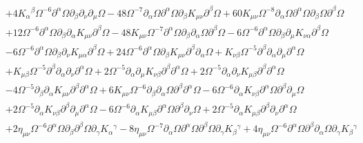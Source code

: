 \documentclass[aps]{revtex4}
\begin{document}
\begin{align}
\nonumber\\
&+ 4 K_{\alpha}{}^{\beta} \Omega^{-6} \partial^{\alpha}\Omega \partial_{\beta}\partial_{\nu}\partial_{\mu}\Omega - 48 \Omega^{-7} \partial_{\alpha}\Omega \partial^{\alpha}\Omega \partial_{\beta}K_{\mu \nu} \partial^{\beta}\Omega + 60 K_{\mu \nu} \Omega^{-8} \partial_{\alpha}\Omega \partial^{\alpha}\Omega \partial_{\beta}\Omega \partial^{\beta}\Omega
\nonumber\\
& + 12 \Omega^{-6} \partial^{\alpha}\Omega \partial_{\beta}\partial_{\alpha}K_{\mu \nu} \partial^{\beta}\Omega - 48 K_{\mu \nu} \Omega^{-7} \partial^{\alpha}\Omega \partial_{\beta}\partial_{\alpha}\Omega \partial^{\beta}\Omega - 6 \Omega^{-6} \partial^{\alpha}\Omega \partial_{\beta}\partial_{\mu}K_{\nu \alpha} \partial^{\beta}\Omega
\nonumber\\
& - 6 \Omega^{-6} \partial^{\alpha}\Omega \partial_{\beta}\partial_{\nu}K_{\mu \alpha} \partial^{\beta}\Omega
 + 24 \Omega^{-6} \partial^{\alpha}\Omega \partial_{\beta}K_{\mu \nu} \partial^{\beta}\partial_{\alpha}\Omega + K_{\nu \beta} \Omega^{-5} \partial^{\beta}\partial_{\alpha}\partial_{\mu}\partial^{\alpha}\Omega 
 \nonumber\\
 &+ K_{\mu \beta} \Omega^{-5} \partial^{\beta}\partial_{\alpha}\partial_{\nu}\partial^{\alpha}\Omega + 2 \Omega^{-5} \partial_{\alpha}\partial_{\mu}K_{\nu \beta} \partial^{\beta}\partial^{\alpha}\Omega + 2 \Omega^{-5} \partial_{\alpha}\partial_{\nu}K_{\mu \beta} \partial^{\beta}\partial^{\alpha}\Omega 
 \nonumber\\
 &- 4 \Omega^{-5} \partial_{\beta}\partial_{\alpha}K_{\mu \nu} \partial^{\beta}\partial^{\alpha}\Omega + 6 K_{\mu \nu} \Omega^{-6} \partial_{\beta}\partial_{\alpha}\Omega \partial^{\beta}\partial^{\alpha}\Omega - 6 \Omega^{-6} \partial_{\alpha}K_{\nu \beta} \partial^{\alpha}\Omega \partial^{\beta}\partial_{\mu}\Omega 
 \nonumber\\
 &+ 2 \Omega^{-5} \partial_{\alpha}K_{\nu \beta} \partial^{\beta}\partial_{\mu}\partial^{\alpha}\Omega - 6 \Omega^{-6} \partial_{\alpha}K_{\mu \beta} \partial^{\alpha}\Omega \partial^{\beta}\partial_{\nu}\Omega + 2 \Omega^{-5} \partial_{\alpha}K_{\mu \beta} \partial^{\beta}\partial_{\nu}\partial^{\alpha}\Omega
 \nonumber\\
 & + 2 \eta_{\mu \nu} \Omega^{-6} \partial^{\alpha}\Omega \partial_{\beta}\partial^{\beta}\Omega \partial_{\gamma}K_{\alpha}{}^{\gamma} - 8 \eta_{\mu \nu} \Omega^{-7} \partial_{\alpha}\Omega \partial^{\alpha}\Omega \partial^{\beta}\Omega \partial_{\gamma}K_{\beta}{}^{\gamma} + 4 \eta_{\mu \nu} \Omega^{-6} \partial^{\alpha}\Omega \partial^{\beta}\partial_{\alpha}\Omega \partial_{\gamma}K_{\beta}{}^{\gamma} 

\end{align}
\end{document}
